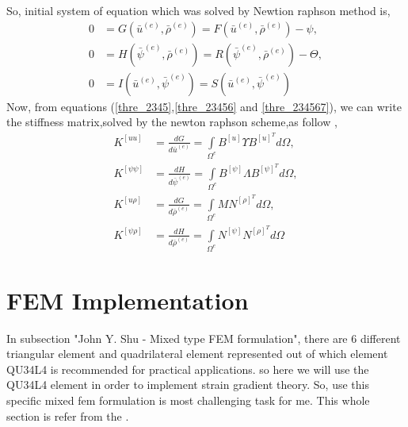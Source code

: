 \documentclass[12pt]{article}
\begin{document}
So, initial system of equation which was solved by Newtion raphson method is,
\begin{equation}\label{thre_234567}
\begin{aligned}
0 &= G(\bar{u}^{(e)},\bar{\rho}^{(e)}) = F(\bar{u}^{(e)},\bar{\rho}^{(e)}) - \psi, \\
0 &= H(\bar{\psi}^{(e)},\bar{\rho}^{(e)}) = R(\bar{\psi}^{(e)},\bar{\rho}^{(e)}) - \Theta, \\
0 &= I(\bar{u}^{(e)},\bar{\psi}^{(e)}) = S(\bar{u}^{(e)},\bar{\psi}^{(e)}) 
\end{aligned}
\end{equation}
Now, from equations (\ref{thre_2345},\ref{thre_23456} and \ref{thre_234567}), we can write the stiffness matrix,solved by the newton raphson scheme,as follow \cite{zybell2012three},
\begin{equation}\label{thre_2345678}
\begin{aligned}
K^{[uu]}  &= \frac{dG}{d\bar{u}^{(e)}} = \int\limits_{\Omega^{e}}\! B^{[u]}\Upsilon B^{[u]^{T}} d\Omega, \\
K^{[\psi\psi]}  &= \frac{dH}{d\bar{\psi}^{(e)}} =\int\limits_{\Omega^{e}}\! B^{[\psi]} \varLambda B^{[\psi]^{T}} d\Omega, \\
K^{[u\rho]}  &= \frac{dG}{d\bar{\rho}^{(e)}}  =\int\limits_{\Omega^{e}}\! M N^{[\rho]^{T}} d\Omega, \\
K^{[\psi\rho]}  &= \frac{dH}{d\bar{\rho}^{(e)}} =\int\limits_{\Omega^{e}}\! N^{[\psi]} N^{[\rho]^{T}} d\Omega
\end{aligned}
\end{equation}
\newpage
\section{FEM Implementation}
In subsection "John Y. Shu - Mixed type FEM formulation", there are 6 different triangular element and quadrilateral element represented out of which element QU34L4 is recommended for practical applications. so here we will use the QU34L4 element in order to implement strain gradient theory. So, use this specific mixed fem formulation is most challenging task for me. This whole section is refer from the \cite{Lzybell2007}.
\\
\end{document}
